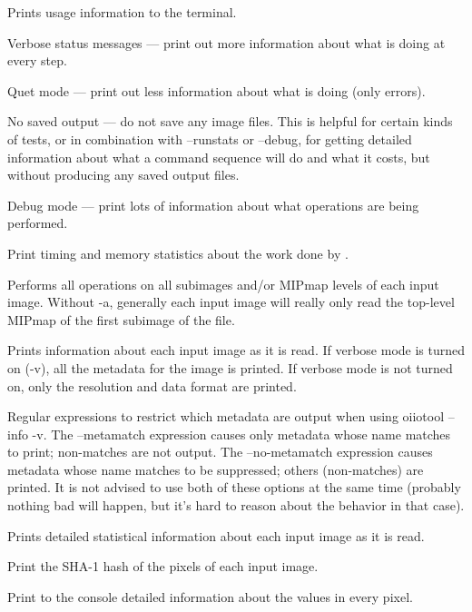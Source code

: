 Prints usage information to the terminal.
\apiend

Verbose status messages --- print out more information about what
\oiiotool is doing at every step.
\apiend

Quet mode --- print out less information about what \oiiotool is doing
(only errors).
\apiend

No saved output --- do not save any image files. This is helpful for certain
kinds of tests, or in combination with {\cf --runstats} or {\cf --debug},
for getting detailed information about what a command sequence will do and
what it costs, but without producing any saved output files.
\apiend

Debug mode --- print lots of information about what operations are being
performed.
\apiend

Print timing and memory statistics about the work done by \oiiotool.
\apiend

Performs all operations on all subimages and/or MIPmap levels of each
input image.  Without {\cf -a}, generally each input image will really
only read the top-level MIPmap of the first subimage of the file.
\apiend

Prints information about each input image as it is read.  If verbose mode
is turned on ({\cf -v}), all the metadata for the image is printed.
If verbose mode is not turned on, only the resolution and data format
are printed.
\apiend

Regular expressions to restrict which metadata are output when using
{\cf oiiotool --info -v}.  The {\cf --metamatch} expression causes only
metadata whose name matches to print; non-matches are not output.  The
{\cf --no-metamatch} expression causes metadata whose name matches to be
suppressed; others (non-matches) are printed.  It is not advised to use
both of these options at the same time (probably nothing bad will
happen, but it's hard to reason about the behavior in that case).
\apiend

Prints detailed statistical information about each input image as it is
read.
\apiend

Print the SHA-1 hash of the pixels of each input image.
\apiend

Print to the console detailed information about the values in every pixel.

